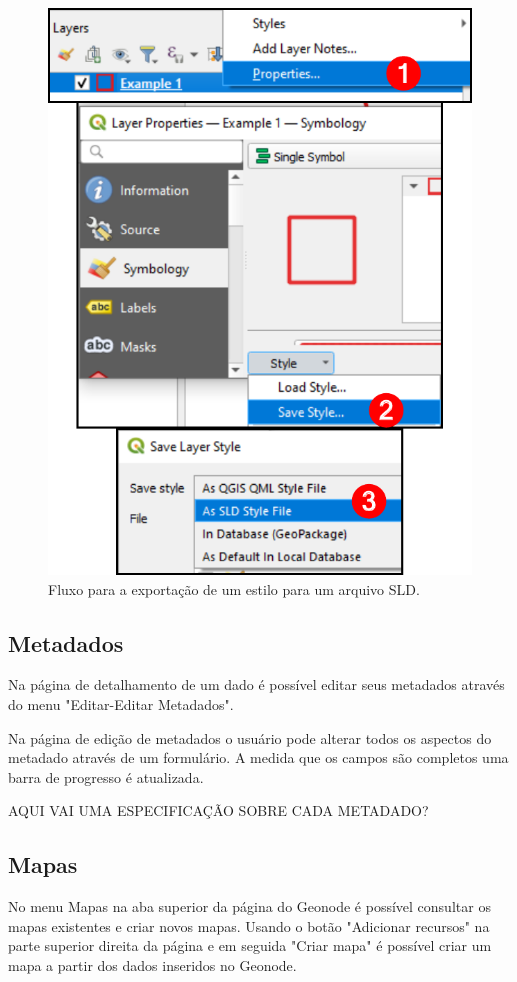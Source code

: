 \documentclass[12pt]{article}
\begin{document}
\begin{figure}[h]
  \centering
  \includegraphics[keepaspectratio]{img/exportarsld.pdf}
  \caption{Fluxo para a exportação de um estilo para um arquivo SLD.}
  \label{fig:exportarsld}
\end{figure}

\subsection{Metadados}

Na página de detalhamento de um dado é possível editar seus metadados
através do menu "Editar-Editar Metadados".

Na página de edição de metadados o usuário pode alterar todos os aspectos do
metadado através de um formulário. A medida que os campos são completos uma
barra de progresso é atualizada. 

AQUI VAI UMA ESPECIFICAÇÃO SOBRE CADA METADADO?

\subsection{Mapas}

No menu Mapas na aba superior da página do Geonode é possível consultar os
mapas existentes e criar novos mapas. Usando o botão "Adicionar recursos" na
parte superior direita da página e em seguida "Criar mapa" é possível criar um
mapa a partir dos dados inseridos no Geonode.



\end{document}
